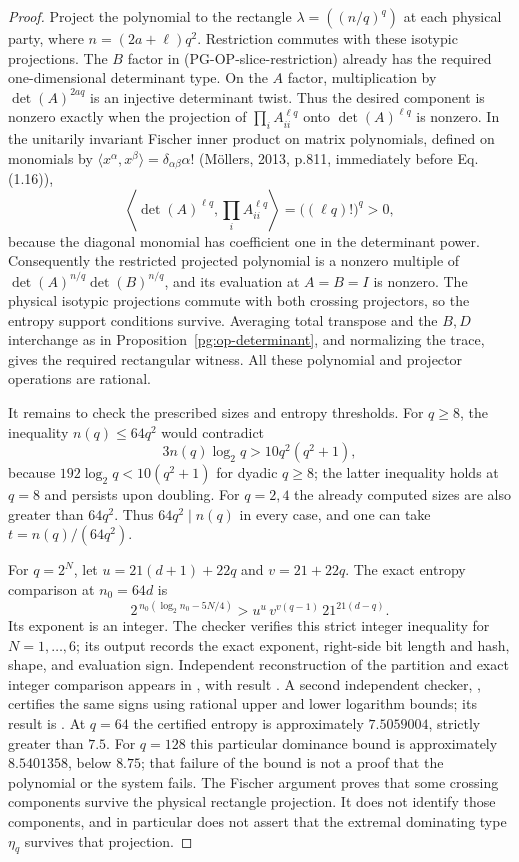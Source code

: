 \begin{proof}
Project the polynomial to the rectangle
$\lambda=((n/q)^q)$ at each physical party, where
$n=(2a+\ell)q^2$. Restriction commutes with these isotypic projections.
The $B$ factor in (PG-OP-slice-restriction) already has the required
one-dimensional determinant type. On the $A$ factor, multiplication by
$\det(A)^{2aq}$ is an injective determinant twist. Thus the desired
component is nonzero exactly when the projection of
$\prod_i A_{ii}^{\ell q}$ onto $\det(A)^{\ell q}$ is nonzero. In the
unitarily invariant Fischer inner product on matrix polynomials,
defined on monomials by
$\langle x^\alpha,x^\beta\rangle=\delta_{\alpha\beta}\alpha!$
(M\"ollers, 2013, p.811, immediately before Eq.(1.16)),
\[
 \left\langle\det(A)^{\ell q},\prod_i A_{ii}^{\ell q}\right\rangle
       =\bigl((\ell q)!\bigr)^q>0,
\]
because the diagonal monomial has coefficient one in the determinant
power. Consequently the restricted projected polynomial is a nonzero
multiple of
$\det(A)^{n/q}\det(B)^{n/q}$, and its evaluation at $A=B=I$ is
nonzero. The physical isotypic projections commute with both crossing
projectors, so the entropy support conditions survive. Averaging total
transpose and the $B,D$ interchange as in
Proposition~\ref{pg:op-determinant}, and normalizing the trace, gives
the required rectangular witness. All these polynomial and projector
operations are rational.

It remains to check the prescribed sizes and entropy thresholds. For
$q\geq8$, the inequality $n(q)\leq64q^2$ would contradict
\[
 3n(q)\log_2q>10q^2(q^2+1),
\]
because $192\log_2q<10(q^2+1)$ for dyadic $q\geq8$; the latter
inequality holds at $q=8$ and persists upon doubling. For $q=2,4$ the
already computed sizes are also greater than $64q^2$. Thus
$64q^2\mid n(q)$ in every case, and one can take
$t=n(q)/(64q^2)$.

For $q=2^N$, let $u=21(d+1)+22q$ and $v=21+22q$.
The exact entropy comparison at $n_0=64d$ is
\[
 2^{\,n_0(\log_2 n_0-5N/4)}
       >u^u\,v^{v(q-1)}\,21^{21(d-q)}.
 \tag{PG-OP-slice-integer}
\]
Its exponent is an integer. The checker
 verifies this strict
integer inequality for $N=1,\ldots,6$; its output
 records the
exact exponent, right-side bit length and hash, shape, and evaluation
sign. Independent reconstruction of the partition and exact integer
comparison appears in ,
with result .
A second independent checker,
, certifies the same signs
using rational upper and lower logarithm bounds; its result is
.
At $q=64$ the certified entropy is approximately $7.5059004$,
strictly greater than $7.5$. For $q=128$ this particular dominance bound
is approximately $8.5401358$, below $8.75$; that failure of the bound
is not a proof that the polynomial or the system fails.
The Fischer argument proves that some crossing components survive the
physical rectangle projection. It does not identify those components,
and in particular does not assert that the extremal dominating type
$\eta_q$ survives that projection.


\end{proof}
